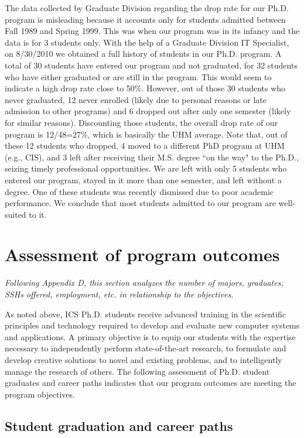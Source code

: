 \documentclass[12pt]{article}
\begin{document}
The data collected by Graduate Division regarding the drop rate for
our Ph.D. program is misleading because it
accounts only for students admitted between Fall 1989 and Spring 1999.
This was when our program was in its infancy and the data is 
for 3 students only.  With the help of a Graduate Division IT
Specialist, on 8/30/2010 we obtained a full history of students in our
Ph.D. program. A total of 30 students have entered our program and not
graduated, for 32 students who have either graduated or are still in
the program. This would seem to indicate a high drop rate close to
50\%. However, out of those 30 students who never graduated, 12 never
enrolled (likely due to personal reasons or late admission to other
programs) and 6 dropped out after only one semester (likely for
similar reasons). Discounting those students, the overall drop rate of
our program is 12/48=27\%, which is basically the UHM average.  Note
that, out of these 12 students who dropped, 4 moved to a different PhD
program at UHM (e.g., CIS), and 3 left after receiving their M.S.
degree ``on the way" to the Ph.D., seizing timely
professional opportunities.  We are left with only 5 students who
entered our program, stayed in it more than one semester, and left
without a degree. One of these students was recently dismissed due to
poor academic performance.  We conclude that most students admitted to
our program are well-suited to it.


\section{Assessment of program outcomes}

{\em Following Appendix D, this section analyzes the number of majors,
  graduates, SSHs offered, employment, etc. in relationship to the
  objectives.}

As noted above, ICS Ph.D. students receive advanced training in the
scientific principles and technology required to develop and evaluate new
computer systems and applications. A primary objective is to equip our
students with the expertise necessary to independently perform
state-of-the-art research, to formulate and develop creative solutions to
novel and existing problems, and to intelligently manage the research of
others.  The following assessment of Ph.D. student graduates and career
paths indicates that our program outcomes are meeting the program
objectives. 

\subsection{Student graduation and career paths}
\end{document}
